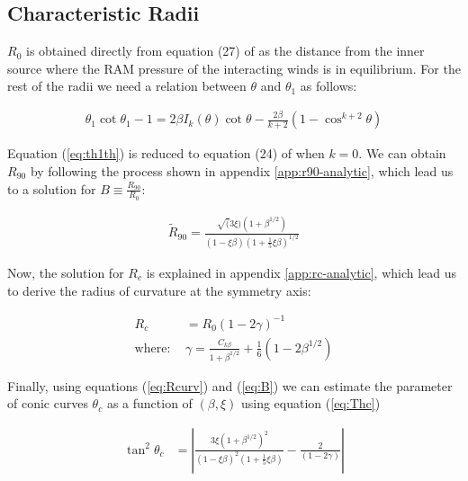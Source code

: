 \subsection{Characteristic Radii}
$R_0$ is obtained directly from equation (27) of \CRW{} as the distance from the inner source where the RAM pressure of the interacting winds is in equilibrium.
For the rest of the radii we need a relation between $\theta$ and $\theta_1$ as follows:


\begin{align}
\theta_1\cot\theta_1 -1 = 2\beta I_k(\theta) \cot\theta - \frac{2\beta}{k+2}\left(1-\cos^{k+2}\theta\right)
\label{eq:th1th}
\end{align}

Equation (\ref{eq:th1th}) is reduced to equation (24) of \CRW{} when $k=0$.
We can obtain $R_{90}$ by following the process shown in appendix \ref{app:r90-analytic},
which lead us to a solution for $B \equiv \frac{R_{90}}{R_0}$:

\begin{align}
\tilde{R}_{90} = \frac{\sqrt(3\xi)\left(1+\beta^{1/2}\right)}{(1-\xi\beta)\left(1+\frac{1}{5}\xi\beta\right)^{1/2}}
\label{eq:B}
\end{align}

Now, the solution for $R_c$ is explained in appendix \ref{app:rc-analytic},
which lead us to derive the radius of curvature at the symmetry axis:

\begin{align}
R_c &= R_0\left(1-2\gamma\right)^{-1} \label{eq:Rcurv} \\
\mathrm{where:~} & \gamma = \frac{C_{k\beta}}{1+\beta^{1/2}}+\frac{1}{6}(1-2\beta^{1/2})
\end{align}

Finally, using equations (\ref{eq:Rcurv}) and (\ref{eq:B}) we can estimate the parameter of
conic curves $\theta_c$ as a function of $(\beta,\xi)$ using equation (\ref{eq:Thc})

\begin{align}
\tan^2\theta_c &= \left| \frac{3\xi\left(1+\beta^{1/2}\right)^2}{\left(1-\xi\beta\right)^2\left(1+\frac{1}{5}\xi\beta\right)}-\frac{2}{\left(1-2\gamma\right)}\right| 
\label{eq:thc-CRW}
\end{align}

